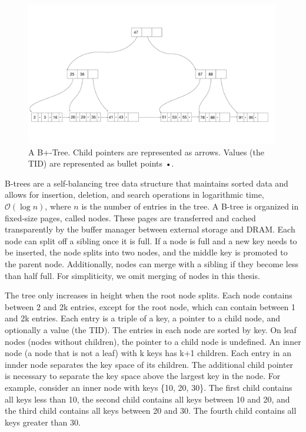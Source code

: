 \begin{figure}[htpb]
  \centering
  \includegraphics[width=0.99\textwidth]{figures/b_tree.pdf}
  \caption{A B+-Tree. Child pointers are represented as arrows. Values (the \ac{TID}) are represented as bullet points •.}
  \label{fig:B-tree}
\end{figure}

B-trees \cite{bayer1970organization} are a self-balancing tree data structure that maintains sorted data and allows for insertion, deletion, and search operations in logarithmic time, $\mathcal{O}(\log n)$, where $n$ is the number of entries in the tree.
A B-tree is organized in fixed-size pages, called nodes. These pages are transferred and cached transparently by the buffer manager between external storage and \ac{DRAM}.
Each node can split off a sibling once it is full. If a node is full and a new key needs to be inserted, the node splits into two nodes, and the middle key is promoted to the parent node.
Additionally, nodes can merge with a sibling if they become less than half full. For simpliticity, we omit merging of nodes in this thesis.

The tree only increases in height when the root node splits.
Each node contains between 2 and 2k entries, except for the root node, which can contain between 1 and 2k entries.
Each entry is a triple of a key, a pointer to a child node, and optionally a value (the \ac{TID}).
The entries in each node are sorted by key. On leaf nodes (nodes without children), the pointer to a child node is undefined.
An inner node (a node that is not a leaf) with k keys has k+1 children.
Each entry in an innder node separates the key space of its children.
The additional child pointer is necessary to separate the key space above the largest key in the node.
For example, consider an inner node with keys \{10, 20, 30\}.
The first child contains all keys less than 10, the second child contains all keys between 10 and 20, and the third child contains all keys between 20 and 30. 
The fourth child contains all keys greater than 30.

